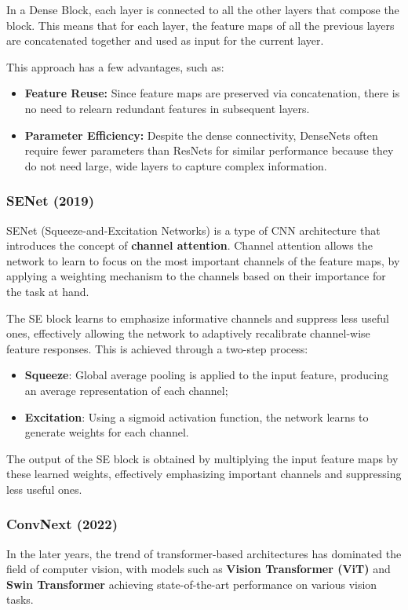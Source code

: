 In a Dense Block, each layer is connected to all the other layers that compose the block. This means that for each layer, the feature maps of
all the previous layers are concatenated together and used as input for the current layer.

This approach has a few advantages, such as:
\begin{itemize}
    \item \textbf{Feature Reuse:} Since feature maps are preserved via concatenation, there is no need to relearn redundant features in subsequent layers.
    \item \textbf{Parameter Efficiency:} Despite the dense connectivity, DenseNets often require fewer parameters than ResNets for similar performance because they do not need large, wide layers to capture complex information.
\end{itemize}

\subsubsection{SENet (2019)}
SENet (Squeeze-and-Excitation Networks) is a type of CNN architecture that introduces the concept of \textbf{channel attention}. 
Channel attention allows the network to learn to focus on the most important channels of the feature maps, by applying a weighting 
mechanism to the channels based on their importance for the task at hand.

The SE block learns to emphasize informative channels and suppress less useful ones, effectively allowing the network to adaptively recalibrate channel-wise feature responses.
This is achieved through a two-step process:
\begin{itemize}
    \item \textbf{Squeeze}: Global average pooling is applied to the input feature, producing an average representation of each channel;
    \item \textbf{Excitation}: Using a sigmoid activation function, the network learns to generate weights for each channel. 
\end{itemize}
The output of the SE block is obtained by multiplying the input feature maps by these learned weights, effectively emphasizing important channels and suppressing less useful ones.

\subsubsection{ConvNext (2022)}
In the later years, the trend of transformer-based architectures has dominated the field of computer vision, with models such as \textbf{Vision Transformer (ViT)} and \textbf{Swin Transformer} 
achieving state-of-the-art performance on various vision tasks.

